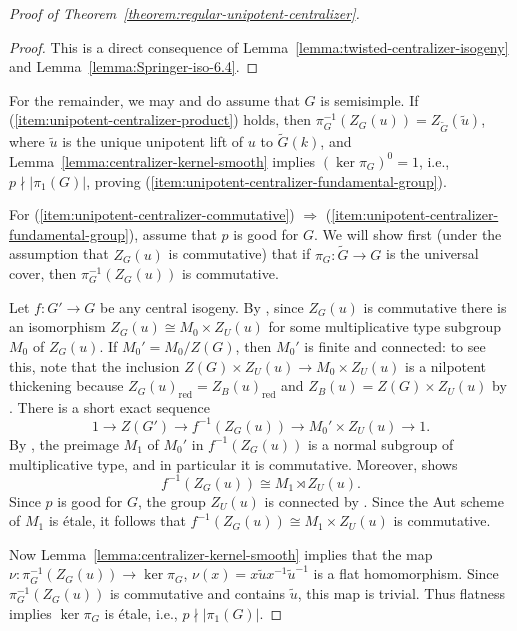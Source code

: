 \documentclass[11pt,reqno]{amsart}
\theoremstyle{definition}
\renewcommand{\rm}{\mathrm}
\begin{document}
\begin{proof}[Proof of Theorem~\ref{theorem:regular-unipotent-centralizer}]
\begin{proof}
This is a direct consequence of Lemma~\ref{lemma:twisted-centralizer-isogeny} and Lemma~\ref{lemma:Springer-iso-6.4}.
\end{proof}

For the remainder, we may and do assume that $G$ is semisimple. If (\ref{item:unipotent-centralizer-product}) holds, then $\pi_G^{-1}(Z_G(u)) = Z_{\widetilde{G}}(\widetilde{u})$, where $\widetilde{u}$ is the unique unipotent lift of $u$ to $\widetilde{G}(k)$, and Lemma~\ref{lemma:centralizer-kernel-smooth} implies $(\ker \pi_G)^0 = 1$, i.e., $p \nmid |\pi_1(G)|$, proving (\ref{item:unipotent-centralizer-fundamental-group}).

For (\ref{item:unipotent-centralizer-commutative}) $\Rightarrow$ (\ref{item:unipotent-centralizer-fundamental-group}), assume that $p$ is good for $G$. We will show first (under the assumption that $Z_G(u)$ is commutative) that if $\pi_G: \widetilde{G} \to G$ is the universal cover, then $\pi_G^{-1}(Z_G(u))$ is commutative. 

Let $f: G' \to G$ be any central isogeny. By \cite[Expos\'e XVII, Th\'eor\`eme 7.2.1]{SGA3II}, since $Z_G(u)$ is commutative there is an isomorphism $Z_G(u) \cong M_0 \times Z_U(u)$ for some multiplicative type subgroup $M_0$ of $Z_G(u)$. If $M_0' = M_0/Z(G)$, then $M_0'$ is finite and connected: to see this, note that the inclusion $Z(G) \times Z_U(u) \to M_0 \times Z_U(u)$ is a nilpotent thickening because $Z_G(u)_{\rm{red}} = Z_B(u)_{\rm{red}}$ and $Z_B(u) = Z(G) \times Z_U(u)$ by \cite[Lemma 3.4]{Integral-Springer}. There is a short exact sequence
\[
1 \to Z(G') \to f^{-1}(Z_G(u)) \to M_0' \times Z_U(u) \to 1.
\]
By \cite[Expos\'e XVII, Proposition 7.1.1]{SGA3II}, the preimage $M_1$ of $M_0'$ in $f^{-1}(Z_G(u))$ is a normal subgroup of multiplicative type, and in particular it is commutative. Moreover, \cite[Expos\'e XVII, Th\'eor\`eme 6.1.1 A) iv)]{SGA3II} shows
\[
f^{-1}(Z_G(u)) \cong M_1 \rtimes Z_U(u).
\]
Since $p$ is good for $G$, the group $Z_U(u)$ is connected by \cite[Theorem 4.11]{Springer}. Since the Aut scheme of $M_1$ is \'etale, it follows that $f^{-1}(Z_G(u)) \cong M_1 \times Z_U(u)$ is commutative.

Now Lemma~\ref{lemma:centralizer-kernel-smooth} implies that the map $\nu\colon \pi_G^{-1}(Z_G(u)) \to \ker \pi_G$, $\nu(x) = x\widetilde{u}x^{-1}\widetilde{u}^{-1}$ is a flat homomorphism. Since $\pi_G^{-1}(Z_G(u))$ is commutative and contains $\widetilde{u}$, this map is trivial. Thus flatness implies $\ker \pi_G$ is \'etale, i.e., $p \nmid |\pi_1(G)|$.
\end{proof}
\end{document}
